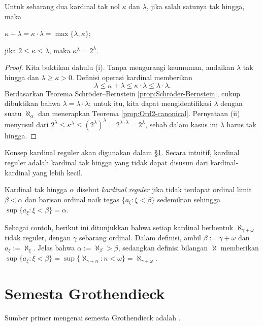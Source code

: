 \begin{corollary}\label{prop:cardinal-max}
	Untuk sebarang dua kardinal tak nol $\kappa$ dan $\lambda$, jika salah satunya tak hingga, maka
	\begin{inparaenum}[(i)]
		\item $\kappa + \lambda = \kappa \cdot \lambda = \max\{\lambda, \kappa\}$;
		\item jika $2 \leq \kappa \leq \lambda$, maka $\kappa^\lambda = 2^\lambda$.
	\end{inparaenum}
\end{corollary}
\begin{proof}
	Kita buktikan dahulu (i). Tanpa mengurangi keumuman, andaikan $\lambda$ tak hingga dan $\lambda \geq \kappa > 0$. Definisi operasi kardinal memberikan
	\[ \lambda \leq \kappa + \lambda \leq \kappa \cdot \lambda \leq \lambda \cdot \lambda. \]
	Berdasarkan Teorema Schröder--Bernstein \ref{prop:Schröder-Bernstein}, cukup dibuktikan bahwa $\lambda = \lambda \cdot \lambda$; untuk itu, kita dapat mengidentifikasi $\lambda$ dengan suatu $\aleph_\alpha$ dan menerapkan Teorema \ref{prop:Ord2-canonical}. Pernyataan (ii) menyusul dari $2^\lambda \leq \kappa^\lambda \leq (2^{\lambda})^\lambda = 2^{\lambda \cdot \lambda} = 2^\lambda$, sebab dalam kasus ini $\lambda$ harus tak hingga.
\end{proof}

Konsep kardinal reguler akan digunakan dalam \S\ref{sec:Grot-universe}. Secara intuitif, kardinal reguler adalah kardinal tak hingga yang tidak dapat disusun dari kardinal-kardinal yang lebih kecil. 
\begin{definition}\label{def:regular-cardinal}
	Kardinal tak hingga $\alpha$ disebut \emph{kardinal reguler} jika tidak terdapat ordinal limit $\beta < \alpha$ dan barisan ordinal naik tegas $\{ a_\xi : \xi < \beta \}$ sedemikian sehingga $\sup \{a_\xi : \xi < \beta\} = \alpha$.
\end{definition}

Sebagai contoh, berikut ini ditunjukkan bahwa setiap kardinal berbentuk $\aleph_{\gamma+\omega}$ tidak reguler, dengan $\gamma$ sebarang ordinal. Dalam definisi, ambil $\beta := \gamma + \omega$ dan $a_\xi := \aleph_\xi$. Jelas bahwa $\alpha := \aleph_\beta > \beta$, sedangkan definisi bilangan $\aleph$ memberikan $\sup \{ a_\xi : \xi < \beta \} = \sup \{ \aleph_{\gamma + n} : n < \omega \} = \aleph_{\gamma+\omega}$.

\section{Semesta Grothendieck}\label{sec:Grot-universe}
Sumber primer mengenai semesta Grothendieck adalah \cite[Exp.\ I, Appendice]{SGA4-1}.

